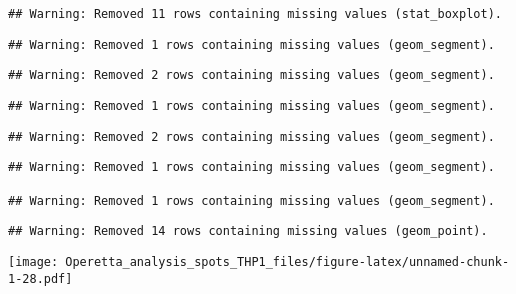 \documentclass[
]{article}
\begin{document}
\begin{verbatim}
## Warning: Removed 11 rows containing missing values (stat_boxplot).
\end{verbatim}

\begin{verbatim}
## Warning: Removed 1 rows containing missing values (geom_segment).
\end{verbatim}

\begin{verbatim}
## Warning: Removed 2 rows containing missing values (geom_segment).
\end{verbatim}

\begin{verbatim}
## Warning: Removed 1 rows containing missing values (geom_segment).
\end{verbatim}

\begin{verbatim}
## Warning: Removed 2 rows containing missing values (geom_segment).
\end{verbatim}

\begin{verbatim}
## Warning: Removed 1 rows containing missing values (geom_segment).

## Warning: Removed 1 rows containing missing values (geom_segment).
\end{verbatim}

\begin{verbatim}
## Warning: Removed 14 rows containing missing values (geom_point).
\end{verbatim}

\texttt{[image: Operetta\_analysis\_spots\_THP1\_files/figure-latex/unnamed-chunk-1-28.pdf]}
\end{document}
